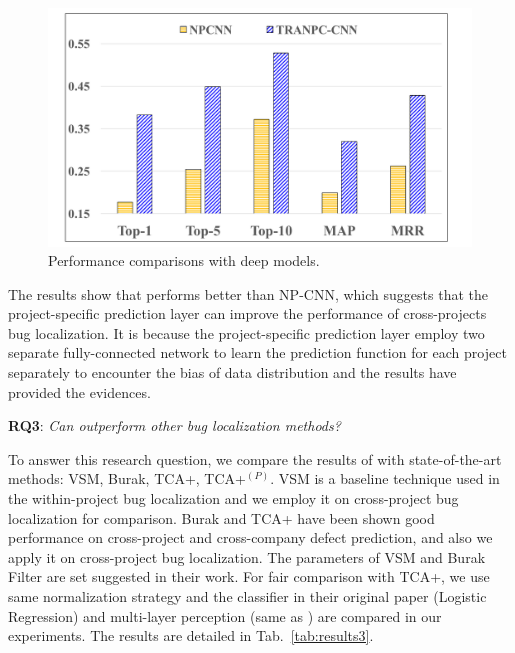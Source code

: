 \begin{figure}[hbt]
\centering
\includegraphics[width = 0.9\columnwidth]{pic/results2_avg.pdf}
\caption{Performance comparisons with deep models.}
\label{fig:results2}
\end{figure}

The results show that \TRANPCNN performs better than NP-CNN, which suggests that the project-specific prediction layer can improve the performance of cross-projects bug localization. It is because the project-specific prediction layer employ two separate fully-connected network to learn the prediction function for each project separately to encounter the bias of data distribution and the results have provided the evidences.  

\textbf{RQ3}: \textit{Can \TRANPCNN outperform other bug localization methods?}

To answer this research question, we compare the results of \TRANPCNN with state-of-the-art methods: VSM, Burak, TCA+, TCA+$^(P)$. VSM is a baseline technique used in the within-project bug localization and we employ it on cross-project bug localization for comparison. Burak and TCA+ have been shown good performance on cross-project and cross-company defect prediction, and also we apply it on cross-project bug localization. The parameters of VSM and Burak Filter are set suggested in their work. For fair comparison with TCA+, we use same normalization strategy and the classifier in their original paper (Logistic Regression) and multi-layer perception (same as \TRANPCNN) are compared in our experiments. The results are detailed in Tab.~\ref{tab:results3}. 


